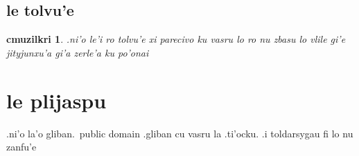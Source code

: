 \documentclass{report}
\newtheorem{cmuzilkri}{cmuzilkri}
\begin{document}
\section{le tolvu'e}
\begin{cmuzilkri}
        .ni'o le'i ro tolvu'e xi parecivo ku vasru lo ro nu zbasu lo vlile gi'e jityjunxu'a gi'a zerle'a ku po'onai
\end{cmuzilkri}

\chapter{le plijaspu}
.ni'o la'o gliban.\ public domain .gliban cu vasru la .ti'ocku.  .i toldarsygau fi lo nu zanfu'e
\end{document}
